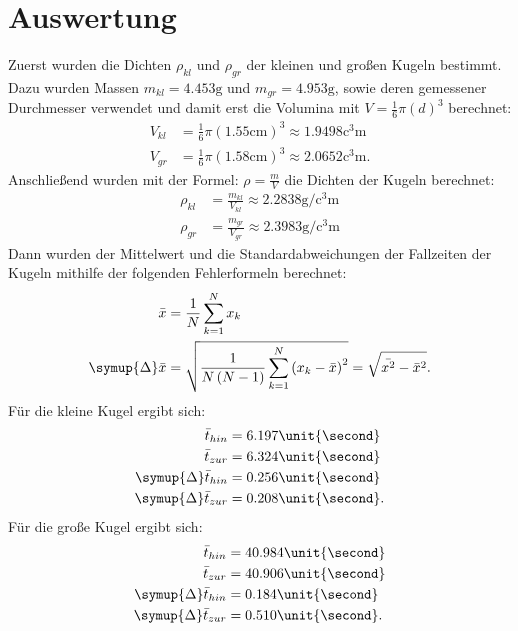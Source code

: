 \section{Auswertung}
\label{sec:Auswertung}

Zuerst wurden die Dichten $\rho_{kl}$ und $\rho_{gr}$ der kleinen und großen Kugeln bestimmt. Dazu wurden Massen
$m_{kl} = 4.453\unit{\gram}$ und $m_{gr} = 4.953 \unit{\gram}$, sowie deren gemessener Durchmesser verwendet und
damit erst die Volumina mit $V = \frac{1}{6}\pi\left(d\right)^3$ berechnet:
\begin{align*}
  V_{kl} &= \frac{1}{6}\pi\left(1.55\unit{\centi\meter}\right)^3 \approx 1.9498\unit{\cubic\centi\meter}\\
  V_{gr} &= \frac{1}{6}\pi\left(1.58\unit{\centi\meter}\right)^3 \approx 2.0652\unit{\cubic\centi\meter}.
\end{align*}
Anschließend wurden mit der Formel: $\rho = \frac{m}{V}$ die Dichten der Kugeln berechnet:
\begin{align*}
  \rho_{kl} &= \frac{m_{kl}}{V_{kl}} \approx 2.2838\unit{\gram\per\cubic\centi\meter}\\
  \rho_{gr} &= \frac{m_{gr}}{V_{gr}} \approx 2.3983\unit{\gram\per\cubic\centi\meter}
\end{align*}
Dann wurden der Mittelwert und die Standardabweichungen der Fallzeiten der Kugeln mithilfe der folgenden Fehlerformeln berechnet:
\begin{align*}
  \bar{x} &= \frac{1}{N}\sum_{k=1}^{N} x_k\\
  \symup{\Delta}\bar{x} &= \sqrt{\frac{1}{N\left(N-1\right)}\sum_{k=1}^{N}\left(x_k-\bar{x}\right)^2} = \sqrt{\bar{x^2}-\bar{x}^2}.
\end{align*}
Für die kleine Kugel ergibt sich:
\begin{align*}
  \bar{t}_{hin} &=6.197\unit{\second}\\
  \bar{t}_{zur} &=6.324\unit{\second}\\
  \symup{\Delta}\bar{t}_{hin} &= 0.256\unit{\second}\\
  \symup{\Delta}\bar{t}_{zur} &= 0.208\unit{\second}.
\end{align*}
Für die große Kugel ergibt sich:
\begin{align*}
  \bar{t}_{hin} &=40.984\unit{\second}\\
  \bar{t}_{zur} &=40.906\unit{\second}\\
  \symup{\Delta}\bar{t}_{hin} &= 0.184\unit{\second}\\
  \symup{\Delta}\bar{t}_{zur} &= 0.510\unit{\second}.
\end{align*}
